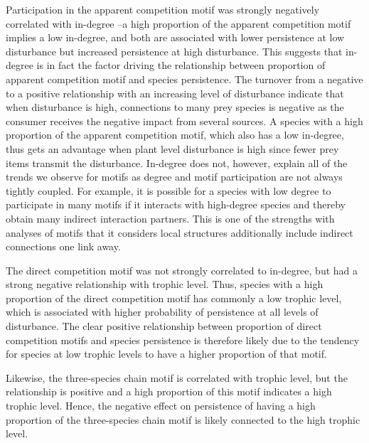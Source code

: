 \documentclass[12pt]{article}
\begin{document}
\begin{spacing}{2.0}
Participation in the apparent competition motif was strongly negatively correlated with in-degree --a high proportion of the apparent competition motif implies a low in-degree, and both are associated with lower persistence at low disturbance but increased persistence at high disturbance. This suggests that in-degree is in fact the factor driving the relationship between proportion of apparent competition motif and species persistence. The turnover from a negative to a positive relationship with an increasing level of disturbance indicate that when disturbance is high, connections to many prey species is negative as the consumer receives the negative impact from several sources. A species with a high proportion of the apparent competition motif, which also has a low in-degree, thus gets an advantage when plant level disturbance is high since fewer prey items transmit the disturbance.
In-degree does not, however, explain all of the trends we observe for motifs as degree and motif participation are not always tightly coupled.
For example, it is possible for a species with low degree to participate in many motifs if it interacts with high-degree species and thereby obtain many indirect interaction partners. This is one of the strengths with analyses of motifs that it considers local structures additionally include indirect connections one link away.

The direct competition motif was not strongly correlated to in-degree, but had a strong negative relationship with trophic level. Thus, species with a high proportion of the direct competition motif has commonly a low trophic level, which is associated with higher probability of persistence at all levels of disturbance.
The clear positive relationship between proportion of direct competition motifs and species persistence is therefore likely due to the tendency for species at low trophic levels to have a higher proportion of that motif.


Likewise, the three-species chain motif is correlated with trophic level, but the relationship is positive and a high proportion of this motif indicates a high trophic level. Hence, the negative effect on persistence of having a high proportion of the three-species chain motif is likely connected to the high trophic level. 


\end{spacing}
\end{document}
